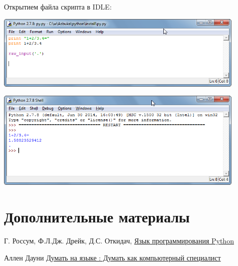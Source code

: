 Открытием файла скрипта в IDLE:
\bigskip




\bigskip
\includegraphics[width=0.9\textwidth]{python/install/049.png}

\includegraphics[width=0.9\textwidth]{python/install/050.png}
\bigskip

\section{Дополнительные материалы}

\cite{pyotkidach} Г. Россум, Ф.Л.Дж. Дрейк, Д.С. Откидач,
\href{http://rus-linux.net/MyLDP/BOOKS/python.pdf}{Язык программирования Python}

\cite{pythink} Аллен Дауни
\href{https://drive.google.com/file/d/0B0u4WeMjO894Q2hWV1QwOFFQOVk/view?usp=sharing}{Думать
на языке \py: Думать как компьютерный специалист}

